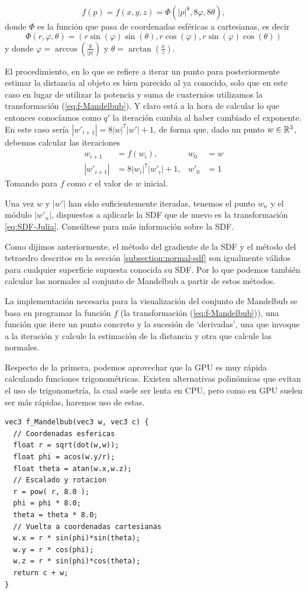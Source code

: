 \begin{equation}
    \label{eq:f-Mandelbub}
    f(p)=f(x,y,z) = \Phi(|p|^8,8\varphi, 8\theta),
\end{equation}
donde $\Phi$ es la función que pasa de coordenadas esféricas a cartesianas, es decir
$$
\Phi(r,\varphi,\theta) = (r\sin(\varphi)\sin(\theta),r\cos(\varphi),r\sin(\varphi)\cos(\theta))
$$
y donde $\varphi = \arccos(\frac{y}{|p|})$ y $\theta=\arctan(\frac{x}{z})$.

El procedimiento, en lo que se refiere a iterar un punto para posteriormente estimar la distancia al objeto es bien parecido al ya conocido, solo que en este caso en lugar de utilizar la potencia y suma de cuaternios utilizamos la transformación (\ref{eq:f-Mandelbub}). Y claro está a la hora de calcular lo que entonces conocíamos como $q'$ la iteración cambia al haber cambiado el exponente. En este caso sería $|w'_{i+1}|=8|w|^7|w'|+1$, de forma que, dado un punto $w\in\mathbb{R}^3$, debemos calcular las iteraciones 
\begin{align*}
    w_{i+1} &= f(w_i), & w_0&=w \\
    |w'_{i+1}| &= 8|w_i|^7|w'_i|+1, & w'_0&=1
\end{align*}
Tomando para $f$ como $c$ el valor de $w$ inicial.

Una vez $w$ y $|w'|$ han sido suficientemente iteradas, tenemos el punto $w_n$ y el módulo $|w'_n|$, dispuestos a aplicarle la SDF que de nuevo es la transformación \ref{eq:SDF-Julia}. Consúltese \cite{mandelbub} para más información sobre la SDF.

Como dijimos anteriormente, el método del gradiente de la SDF y el método del tetraedro descritos en la sección \ref{subsection:normal-sdf} son igualmente válidos para cualquier superficie supuesta conocida su SDF. Por lo que podemos también calcular las normales al conjunto de Mandelbub a partir de estos métodos.

La implementación necesaria para la visualización del conjunto de Mandelbub se basa en programar la función $f$ (la transformación (\ref{eq:f-Mandelbub})), una función que itere un punto concreto y la sucesión de `derivadas', una que invoque a la iteración y calcule la estimación de la distancia y otra que calcule las normales.

Respecto de la primera, podemos aprovechar que la GPU es muy rápida calculando funciones trigonométricas. Existen alternativas polinómicas que evitan el uso de trigonometría, la cual suele ser lenta en CPU, pero como en GPU suelen ser más rápidas, haremos uso de estas. 
\begin{lstlisting}
vec3 f_Mandelbub(vec3 w, vec3 c) {
  // Coordenadas esfericas
  float r = sqrt(dot(w,w));
  float phi = acos(w.y/r);
  float theta = atan(w.x,w.z);
  // Escalado y rotacion
  r = pow( r, 8.0 );
  phi = phi * 8.0;
  theta = theta * 8.0;
  // Vuelta a coordenadas cartesianas
  w.x = r * sin(phi)*sin(theta);
  w.y = r * cos(phi);
  w.z = r * sin(phi)*cos(theta);
  return c + w;
}
\end{lstlisting}

